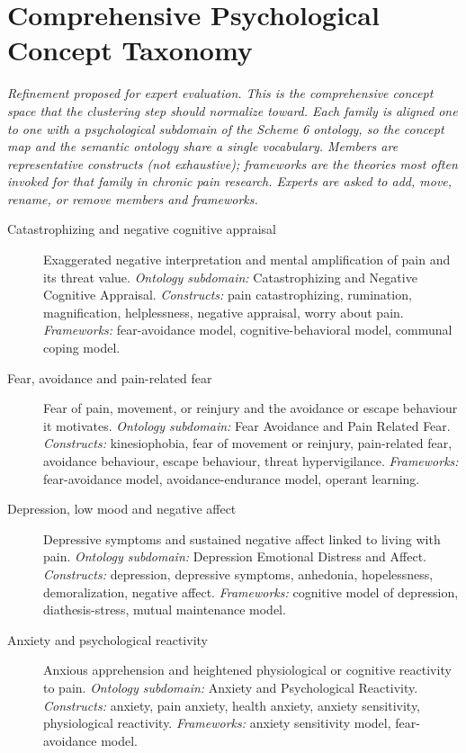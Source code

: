 \documentclass[11pt]{article}
\begin{document}
\section*{Comprehensive Psychological Concept Taxonomy}
{\small\itshape Refinement proposed for expert evaluation. This is the comprehensive concept space that the clustering step should normalize toward. Each family is aligned one to one with a psychological subdomain of the Scheme 6 ontology, so the concept map and the semantic ontology share a single vocabulary. Members are representative constructs (not exhaustive); frameworks are the theories most often invoked for that family in chronic pain research. Experts are asked to add, move, rename, or remove members and frameworks.}\par\smallskip
\begin{description}
\item[Catastrophizing and negative cognitive appraisal] Exaggerated negative interpretation and mental amplification of pain and its threat value.
{\small \textit{Ontology subdomain:} Catastrophizing and Negative Cognitive Appraisal. \textit{Constructs:} pain catastrophizing, rumination, magnification, helplessness, negative appraisal, worry about pain. \textit{Frameworks:} fear-avoidance model, cognitive-behavioral model, communal coping model.}
\item[Fear, avoidance and pain-related fear] Fear of pain, movement, or reinjury and the avoidance or escape behaviour it motivates.
{\small \textit{Ontology subdomain:} Fear Avoidance and Pain Related Fear. \textit{Constructs:} kinesiophobia, fear of movement or reinjury, pain-related fear, avoidance behaviour, escape behaviour, threat hypervigilance. \textit{Frameworks:} fear-avoidance model, avoidance-endurance model, operant learning.}
\item[Depression, low mood and negative affect] Depressive symptoms and sustained negative affect linked to living with pain.
{\small \textit{Ontology subdomain:} Depression Emotional Distress and Affect. \textit{Constructs:} depression, depressive symptoms, anhedonia, hopelessness, demoralization, negative affect. \textit{Frameworks:} cognitive model of depression, diathesis-stress, mutual maintenance model.}
\item[Anxiety and psychological reactivity] Anxious apprehension and heightened physiological or cognitive reactivity to pain.
{\small \textit{Ontology subdomain:} Anxiety and Psychological Reactivity. \textit{Constructs:} anxiety, pain anxiety, health anxiety, anxiety sensitivity, physiological reactivity. \textit{Frameworks:} anxiety sensitivity model, fear-avoidance model.}

\end{description}
\end{document}
